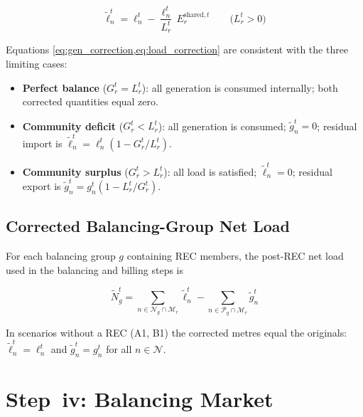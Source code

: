 \documentclass[12pt,a4paper]{article}
\begin{document}
\begin{equation}
\tilde{\ell}_{n}^{t} = \ell_{n}^{t}
  - \frac{\ell_{n}^{t}}{L_{r}^{t}}\,E_{r}^{\mathrm{shared},t}
  \qquad \bigl(L_{r}^{t} > 0\bigr)
\label{eq:load_correction}
\end{equation}

Equations \cref{eq:gen_correction,eq:load_correction} are consistent with the
three limiting cases:
\begin{itemize}
\item \textbf{Perfect balance} ($G_{r}^{t} = L_{r}^{t}$): all generation is
  consumed internally; both corrected quantities equal zero.
\item \textbf{Community deficit} ($G_{r}^{t} < L_{r}^{t}$): all generation is
  consumed; $\tilde{g}_{n}^{t} = 0$; residual import is
  $\tilde{\ell}_{n}^{t} = \ell_{n}^{t}\!\left(1 - G_{r}^{t}/L_{r}^{t}\right)$.
\item \textbf{Community surplus} ($G_{r}^{t} > L_{r}^{t}$): all load is
  satisfied; $\tilde{\ell}_{n}^{t} = 0$; residual export is
  $\tilde{g}_{n}^{t} = g_{n}^{t}\!\left(1 - L_{r}^{t}/G_{r}^{t}\right)$.
\end{itemize}

\subsection{Corrected Balancing-Group Net Load}

For each balancing group $g$ containing REC members, the post-REC net
load used in the balancing and billing steps is

\begin{equation}
\tilde{N}_{g}^{t}
  = \sum_{n \in \mathcal{N}_{g} \cap \mathcal{M}_{r}} \tilde{\ell}_{n}^{t}
  - \sum_{n \in \mathcal{P}_{g} \cap \mathcal{M}_{r}} \tilde{g}_{n}^{t}
\label{eq:bg_corrected_net}
\end{equation}

In scenarios without a REC (A1, B1) the corrected metres equal the originals:
$\tilde{\ell}_{n}^{t} = \ell_{n}^{t}$ and
$\tilde{g}_{n}^{t} = g_{n}^{t}$ for all $n \in \mathcal{N}$.

\section{Step~iv: Balancing Market}
\end{document}
